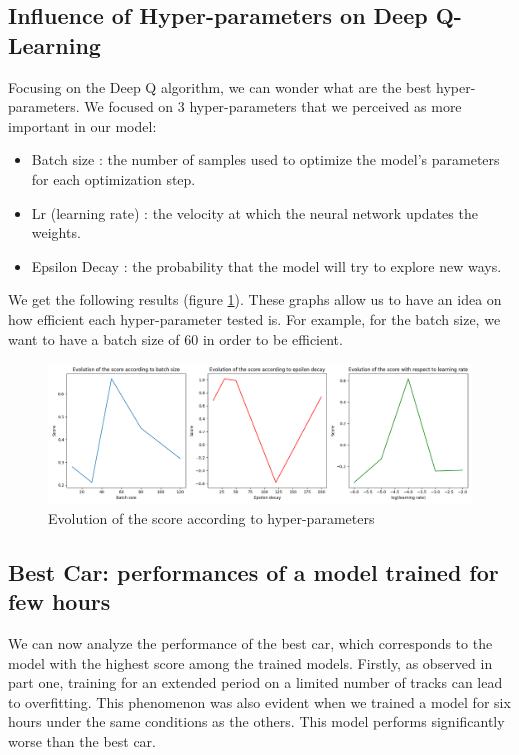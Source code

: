 \documentclass[11pt,a4paper]{article}
\newcounter{fig}
\newcommand{\mlist}[1]{\begin{itemize}[noitemsep,topsep=0pt]#1\end{itemize}}
\begin{document}
		\subsection*{Influence of Hyper-parameters on Deep Q-Learning}
Focusing on the Deep Q algorithm, we can wonder what are the best hyper-parameters. We focused on $3$ hyper-parameters that we perceived as more important in our model:
\mlist{
\item Batch size : the number of samples used to optimize the model's parameters for each optimization step. 
\item Lr (learning rate) : the velocity at which the neural network updates the weights. 
\item Epsilon Decay : the probability that the model will try to explore new ways. 
}
We get the following results (figure \ref{figure:Evolution of score depending of hyper-parameter}). These graphs allow us to have an idea on how efficient each hyper-parameter tested is. For example, for the batch size, we want to have a batch size of $60$ in order to be efficient.
        \begin{figure}[ht]
            \centering
            \includegraphics[scale = 0.46]{comparaison2.png}
            \caption{Evolution of the score according to hyper-parameters}
            \label{figure:Evolution of score depending of hyper-parameter}
        \end{figure}
        
        
  
		\subsection*{Best Car: performances of a model trained for few hours }
        We can now analyze the performance of the best car, which corresponds to the model with the highest score among the trained models.  
Firstly, as observed in part one, training for an extended period on a limited number of tracks can lead to overfitting. This phenomenon was also evident when we trained a model for six hours under the same conditions as the others.  
This model performs significantly worse than the best car.  
\end{document}
